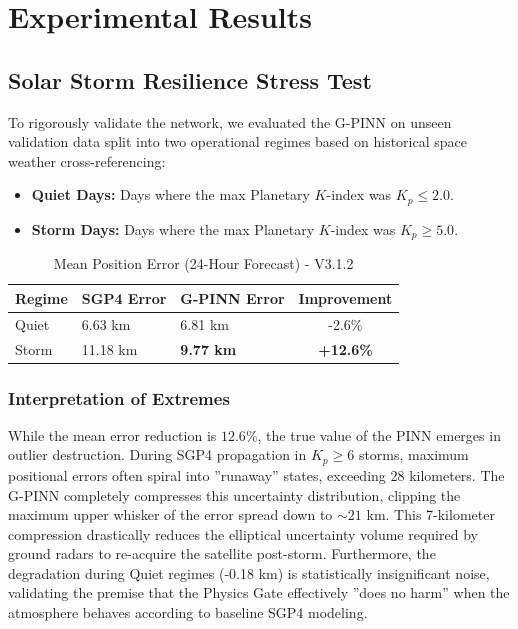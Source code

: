 \section{Experimental Results}

\subsection{Solar Storm Resilience Stress Test}
To rigorously validate the network, we evaluated the G-PINN on unseen validation data split into two operational regimes based on historical space weather cross-referencing:
\begin{itemize}
    \item \textbf{Quiet Days:} Days where the max Planetary $K$-index was $K_p \le 2.0$.
    \item \textbf{Storm Days:} Days where the max Planetary $K$-index was $K_p \ge 5.0$.
\end{itemize}

\begin{table}[H]
\centering
\caption{Mean Position Error (24-Hour Forecast) - V3.1.2}
\label{tab:stress_test}
\begin{tabular}{@{}lllc@{}}
\toprule
Regime & SGP4 Error & G-PINN Error & Improvement \\ \midrule
Quiet  & 6.63 km    & 6.81 km      & -2.6\%      \\
Storm  & 11.18 km   & \textbf{9.77 km}      & \textbf{+12.6\%}     \\ \bottomrule
\end{tabular}
\end{table}

\subsubsection{Interpretation of Extremes}
While the mean error reduction is $12.6\%$, the true value of the PINN emerges in outlier destruction. During SGP4 propagation in $K_p \ge 6$ storms, maximum positional errors often spiral into ''runaway'' states, exceeding $28$ kilometers. The G-PINN completely compresses this uncertainty distribution, clipping the maximum upper whisker of the error spread down to $\sim 21$ km. This 7-kilometer compression drastically reduces the elliptical uncertainty volume required by ground radars to re-acquire the satellite post-storm. Furthermore, the degradation during Quiet regimes (-0.18 km) is statistically insignificant noise, validating the premise that the Physics Gate effectively ''does no harm'' when the atmosphere behaves according to baseline SGP4 modeling.

